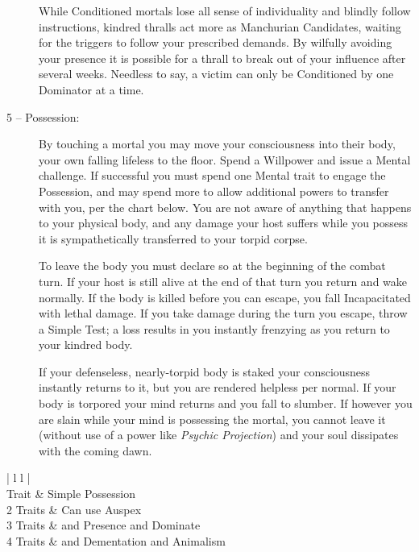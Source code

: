 \begin{description}
	While Conditioned mortals lose all sense of individuality and blindly follow instructions, 
	kindred thralls act more as Manchurian Candidates, waiting for the triggers to follow your 
	prescribed demands.  By wilfully avoiding your presence it is possible for a thrall to break 
	out of your influence after several weeks.  Needless to say, a victim can only be Conditioned by 
	one Dominator at a time.
	\item[5 -- Possession:]  By touching a mortal you may move your consciousness into their 
	body, your own falling lifeless to the floor.  Spend a Willpower and issue a Mental 
	challenge.  If successful you must spend one Mental trait to engage the Possession, and 
	may spend more to allow additional powers to transfer with you, per the chart below.  You 
	are not aware of anything that happens to your physical body, and any damage your host suffers 
	while you possess it is sympathetically transferred to your torpid corpse.
	
	To leave the body you must declare so at the beginning of the combat turn. If your host is 
	still alive at the end of that turn you return and wake normally. If the body is killed 
	before you can escape, you fall Incapacitated with lethal damage. If you take damage during 
	the turn you escape, throw a Simple Test; a loss results in you instantly frenzying as you return 
	to your kindred body.
	
	If your defenseless, nearly-torpid body is staked your consciousness instantly returns to it, 
	but you are rendered helpless per normal.  If your body is torpored your mind returns and you 
	fall to slumber.  If however you are slain while your mind is possessing the mortal, you cannot 
	leave it (without use of a power like \emph{Psychic Projection}) and your soul dissipates with 
	the coming dawn.
\end{description}

\begin{center}
\begin{tabular}{ | l l |}
	\hline
	 \\
	 Trait & Simple Possession \\
	2 Traits & Can use Auspex \\
	3 Traits & and Presence and Dominate \\
	4 Traits & and Dementation and Animalism \\
	\hline
\end{tabular}
\end{center}

